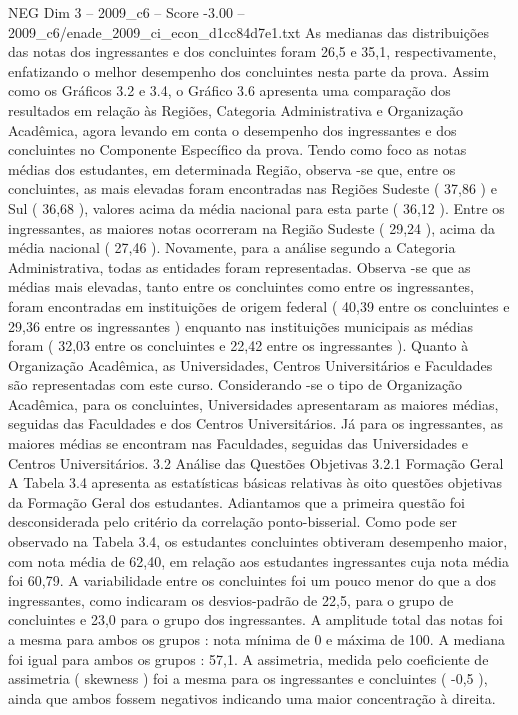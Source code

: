 \begin{textsample}{NEG Dim 3 – 2009\_c6 – Score -3.00 – 2009\_c6/enade\_2009\_ci\_econ\_d1cc84d7e1.txt}
As medianas das distribuições das notas dos ingressantes e dos concluintes foram 26,5 e 35,1, respectivamente, enfatizando o melhor desempenho dos concluintes nesta parte da prova.
Assim como os Gráficos 3.2 e 3.4, o Gráfico 3.6 apresenta uma comparação dos resultados em relação às Regiões, Categoria Administrativa e Organização Acadêmica, agora levando em conta o desempenho dos ingressantes e dos concluintes no Componente Específico da prova.
Tendo como foco as notas médias dos estudantes, em determinada Região, observa -se que, entre os concluintes, as mais elevadas foram encontradas nas Regiões Sudeste ( 37,86 ) e Sul ( 36,68 ), valores acima da média nacional para esta parte ( 36,12 ).
Entre os ingressantes, as maiores notas ocorreram na Região Sudeste ( 29,24 ), acima da média nacional ( 27,46 ).
Novamente, para a análise segundo a Categoria Administrativa, todas as entidades foram representadas.
Observa -se que as médias mais elevadas, tanto entre os concluintes como entre os ingressantes, foram encontradas em instituições de origem federal ( 40,39 entre os concluintes e 29,36 entre os ingressantes ) enquanto nas instituições municipais as médias foram ( 32,03 entre os concluintes e 22,42 entre os ingressantes ).
Quanto à Organização Acadêmica, as Universidades, Centros Universitários e Faculdades são representadas com este curso.
Considerando -se o tipo de Organização Acadêmica, para os concluintes, Universidades apresentaram as maiores médias, seguidas das Faculdades e dos Centros Universitários.
Já para os ingressantes, as maiores médias se encontram nas Faculdades, seguidas das Universidades e Centros Universitários. 3.2 Análise das Questões Objetivas 3.2.1 Formação Geral A Tabela 3.4 apresenta as estatísticas básicas relativas às oito questões objetivas da Formação Geral dos estudantes.
Adiantamos que a primeira questão foi desconsiderada pelo critério da correlação ponto-bisserial.
Como pode ser observado na Tabela 3.4, os estudantes concluintes obtiveram desempenho maior, com nota média de 62,40, em relação aos estudantes ingressantes cuja nota média foi 60,79.
A variabilidade entre os concluintes foi um pouco menor do que a dos ingressantes, como indicaram os desvios-padrão de 22,5, para o grupo de concluintes e 23,0 para o grupo dos ingressantes.
A amplitude total das notas foi a mesma para ambos os grupos : nota mínima de 0 e máxima de 100.
A mediana foi igual para ambos os grupos : 57,1.
A assimetria, medida pelo coeficiente de assimetria ( skewness ) foi a mesma para os ingressantes e concluintes ( -0,5 ), ainda que ambos fossem negativos indicando uma maior concentração à direita.

\end{textsample}
